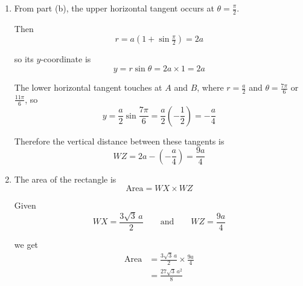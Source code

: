 \documentclass[leqno]{article}
\begin{document}
\begin{enumerate}[
  label=\textbf{\arabic*.},
  leftmargin=*,
  topsep=0pt,
  partopsep=0pt,
  parsep=0pt
]
\begin{djsSolution}
\begin{enumerate}[label=\textbf{(\alph*)}]
  Hence either
  \[
  \cos\theta=0
  \quad\text{or}\quad
  1+2\sin\theta=0
  \]

  From \(\cos\theta=0\):
  \[
  \theta=\frac{\pi}{2},\ \frac{3\pi}{2}
  \]

  From \(1+2\sin\theta=0\):
  \[
  \sin\theta=-\frac12
  \]

  so
  \[
  \theta=\frac{7\pi}{6},\ \frac{11\pi}{6}
  \]

  At \(\theta=\frac{3\pi}{2}\):
  \[
  r=a(1+\sin\tfrac{3\pi}{2})=a(1-1)=0
  \]

  so this is the cusp at the pole, not a smooth horizontal tangent.

  Therefore the values of \(\theta\) for which the tangent is parallel to the initial line are
  \[
  \theta=\frac{\pi}{2},\ \frac{7\pi}{6},\ \frac{11\pi}{6}
  \]

  The line \(ZY\) is the lower horizontal tangent, so it touches \(C\) at the two lower points, where
  \[
  \theta=\frac{7\pi}{6},\ \frac{11\pi}{6}
  \]

  At each of these:
  \[
  r=a\left(1+\sin\theta\right)=a\left(1-\frac12\right)=\frac a2
  \]

  Hence the polar coordinates are
  \[
  A\left(\frac a2,\frac{7\pi}{6}\right),
  \qquad
  B\left(\frac a2,\frac{11\pi}{6}\right)
  \]

  \item From part (b), the upper horizontal tangent occurs at \(\theta=\frac{\pi}{2}\).

  Then
  \[
  r=a(1+\sin\tfrac{\pi}{2})=2a
  \]

  so its \(y\)-coordinate is
  \[
  y=r\sin\theta=2a\times 1=2a
  \]

  The lower horizontal tangent touches at \(A\) and \(B\), where \(r=\frac a2\) and \(\theta=\frac{7\pi}{6}\) or \(\frac{11\pi}{6}\), so
  \[
  y=\frac a2\sin\frac{7\pi}{6}=\frac a2\left(-\frac12\right)=-\frac a4
  \]

  Therefore the vertical distance between these tangents is
  \[
  WZ=2a-\left(-\frac a4\right)=\frac{9a}{4}
  \]

  \item The area of the rectangle is
  \[
  \text{Area} = WX\times WZ
  \]

  Given
  \[
  WX=\frac{3\sqrt3\,a}{2}
  \qquad\text{and}\qquad
  WZ=\frac{9a}{4}
  \]

  we get
  \begin{align*}
  \text{Area}
  &= \frac{3\sqrt3\,a}{2}\times \frac{9a}{4} \\
  &= \frac{27\sqrt3\,a^2}{8}
  \end{align*}


\end{enumerate}
\end{djsSolution}
\end{enumerate}
\end{document}
